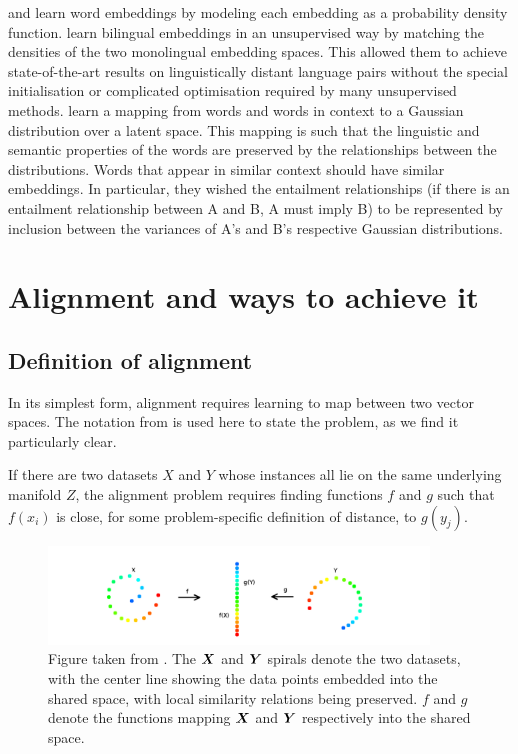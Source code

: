\cite{DensityMatchingWordEmbeddings} and \cite{vilnis2015word} learn word embeddings by modeling each embedding as a probability density function. \cite{DensityMatchingWordEmbeddings} learn bilingual embeddings in an unsupervised way by matching the densities of the two monolingual embedding spaces. This allowed them to achieve state-of-the-art results on linguistically distant language pairs without the special initialisation or complicated optimisation required by many unsupervised methods. \cite{vilnis2015word} learn a mapping from words and words in context to a Gaussian distribution over a latent space. This mapping is such that the linguistic and semantic properties of the words are preserved by the relationships between the distributions. Words that appear in similar context should have similar embeddings. In particular, they wished the entailment relationships (if there is an entailment relationship between A and B, A must imply B) to be represented by inclusion between the variances of A's and B's respective Gaussian distributions. 

\section{Alignment and ways to achieve it}
    
\subsection{Definition of alignment}

In its simplest form, alignment requires learning to map between two vector spaces. 
The notation from \cite{ManifoldLearningTheoryAndApplications} is used here to state the problem, as we find it particularly clear.

If there are two datasets $X$ and $Y$ whose instances all lie on the same underlying manifold $Z$, the alignment problem requires finding functions $f$ and $g$ such that $f(x_i)$ is close, for some problem-specific definition of distance, to $g(y_j)$.

\begin{figure}[H]
    \centering
    \includegraphics[width=0.9\textwidth]{images/review/alignment.png}
    \caption{
        Figure taken from \cite{ManifoldLearningTheoryAndApplications}. The $\boldsymbol{X}$ and $\boldsymbol{Y}$ spirals denote the two datasets, with the center line showing the data points embedded into the shared space, with local similarity relations being preserved. $f$ and $g$ denote the functions mapping $\boldsymbol{X}$ and $\boldsymbol{Y}$ respectively into the shared space. 
    }
\end{figure}

